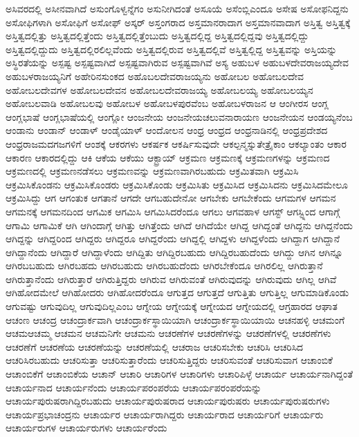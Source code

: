 {ಅಸಿವರದಲ್ಲಿ
ಅಸೀನವಾಗಿದೆ
ಅಸುಂಗೊಳ್ವನ್ನೆಗಂ
ಅಸುನೀಗಿದಂತೆ
ಅಸೂಯೆ
ಅಸೆಂಬ್ಲಿಎಂದೂ
ಅಸೇಷ
ಅಸೋಫನಿದ್ದನು
ಅಸೋಫಿಗಳಾಗಿ
ಅಸೋಫಿಗೆ
ಅಸೋಫ್
ಅಸ್ಕರ್
ಅಸ್ತಂಗರಾದ
ಅಸ್ತಮಾನರಾದಾಗ
ಅಸ್ತಮಾನವಾದಾಗ
ಅಸ್ತಿತ್ವ
ಅಸ್ತಿತ್ವಕ್ಕೆ
ಅಸ್ತಿತ್ವದಲ್ಲಿತ್ತು
ಅಸ್ತಿತ್ವದಲ್ಲಿತ್ತೆಂದು
ಅಸ್ತಿತ್ವದಲ್ಲಿತ್ತೆಂಬುದು
ಅಸ್ತಿತ್ವದಲ್ಲಿದ್ದ
ಅಸ್ತಿತ್ವದಲ್ಲಿದ್ದವು
ಅಸ್ತಿತ್ವದಲ್ಲಿದ್ದು
ಅಸ್ತಿತ್ವದಲ್ಲಿದ್ದುದು
ಅಸ್ತಿತ್ವದಲ್ಲಿರಲಿಲ್ಲವೆಂದು
ಅಸ್ತಿತ್ವದಲ್ಲಿರುವ
ಅಸ್ತಿತ್ವದಲ್ಲಿವೆ
ಅಸ್ತಿತ್ವಲ್ಲಿದ್ದ
ಅಸ್ತಿತ್ವವನ್ನು
ಅಸ್ತಿಯನ್ನು
ಅಸ್ಥಿರತೆಯನ್ನು
ಅಸ್ಪಷ್ಟ
ಅಸ್ಪಷ್ಟವಾಗಿದೆ
ಅಸ್ಪಷ್ಟವಾಗಿರುವ
ಅಸ್ಪಷ್ಟವಾಗಿವೆ
ಅಸ್ಯ
ಅಹುಬಳ
ಅಹುಬಳದೇವರಾಜಯ್ಯದೇವ
ಅಹುಬಳರಾಜಯ್ಯನಿಗೆ
ಅಹೇರಿನಸುಂಕದ
ಅಹೊಬಲದೇವರಾಜಯ್ಯನು
ಅಹೋಬಲ
ಅಹೋಬಲದೇವ
ಅಹೋಬಲದೇವಗಳ
ಅಹೋಬಲದೇವನ
ಅಹೋಬಲದೇವರಾಜಯ್ಯ
ಅಹೋಬಲಯ್ಯ
ಅಹೋಬಲಯ್ಯನ
ಅಹೋಬಲವಾಡಿ
ಅಹೋಬಲವು
ಅಹೋಬಳ
ಅಹೋಬಳಪುರವೆಂಬ
ಅಹೋಬಳರಾಜನ
ಆ
ಆಂಗೀರಸ
ಆಂಗ್ಲ
ಆಂಗ್ಲಭಾಷೆ
ಆಂಗ್ಲಭಾಷೆಯಲ್ಲಿ
ಆಂಗ್ಲೋ
ಆಂಜನೇಯ
ಆಂಜನೇಯಚಲುವನಾರಾಯಣ
ಆಂಜನೇಯನ
ಆಂಡಯ್ಯನೆಂಬ
ಆಂಡಾನು
ಆಂಡಾನ್
ಆಂಡಾಳ್
ಆಂಡೈಯಾಳ್
ಆಂದೋಲನ
ಆಂಧ್ರ
ಆಂಧ್ರದ
ಆಂಧ್ರನಾಡಿನಲ್ಲಿ
ಆಂಧ್ರಪ್ರದೇಶದ
ಆಂಧ್ರರಾಜಮದಗಜಗಳಿಗೆ
ಆಂಶಕ್ಕೆ
ಆಕರಗಳು
ಆಕರ್ಷಕ
ಆಕರ್ಷಿಸುವುದೇ
ಆಕಲ್ಪನ್ಮಸ್ನುತೇತ್ರೈಕಾಂ
ಆಕಲ್ಯಾಂತಂ
ಆಕಾರ
ಆಕಾರಣ
ಆಕಾರದಲ್ಲಿದ್ದು
ಆಕಿ
ಆಕೆಯ
ಆಕೆಯು
ಆಕ್ಟ್ರಾಯ್
ಆಕ್ರಮಣ
ಆಕ್ರಮಣಕ್ಕೆ
ಆಕ್ರಮಣಗಳನ್ನು
ಆಕ್ರಮಣದ
ಆಕ್ರಮಣದಲ್ಲಿ
ಆಕ್ರಮಣನಡೆಸಲು
ಆಕ್ರಮಣವನ್ನು
ಆಕ್ರಮಣವಾಗಿರಬಹುದು
ಆಕ್ರಮಿತವಾಗಿ
ಆಕ್ರಮಿಸಿ
ಆಕ್ರಮಿಸಿಕೊಂಡನು
ಆಕ್ರಮಿಸಿಕೊಂಡರು
ಆಕ್ರಮಿಸಿಕೊಂಡು
ಆಕ್ರಮಿಸಿತು
ಆಕ್ರಮಿಸಿದ
ಆಕ್ರಮಿಸಿದನು
ಆಕ್ರಮಿಸಿದಮೇಲೂ
ಆಕ್ರಮಿಸಿದ್ದು
ಆಗ
ಆಗಂತುಕ
ಆಗತಾನೆ
ಆಗದೇ
ಆಗಬಹುದೇನೋ
ಆಗಬೇಕು
ಆಗಬೇಕೆಂದು
ಆಗಮಗಳ
ಆಗಮನ
ಆಗಮನಕ್ಕೆ
ಆಗಮನದಿಂದ
ಆಗಮಿಕ
ಆಗಮಿಸಿ
ಆಗಮಿಸಿದರೆಂದೂ
ಆಗಲು
ಆಗವಹಾಳ
ಆಗಸ್ಟ್
ಆಗಸ್ಟ್ನಿಂದ
ಆಗಾಗ್ಗೆ
ಆಗಾಮಿ
ಆಗಾಮಿಕೆ
ಆಗಿ
ಆಗಿಂದಾಗ್ಗೆ
ಆಗಿತ್ತು
ಆಗಿತ್ತೆಂದು
ಆಗಿದೆ
ಆಗಿದೆಯೇ
ಆಗಿದ್ದ
ಆಗಿದ್ದಂತೆ
ಆಗಿದ್ದನು
ಆಗಿದ್ದನೆಂದು
ಆಗಿದ್ದನ್ನು
ಆಗಿದ್ದರಿಂದ
ಆಗಿದ್ದರು
ಆಗಿದ್ದರೂ
ಆಗಿದ್ದರೆಂದು
ಆಗಿದ್ದಲ್ಲಿ
ಆಗಿದ್ದಳು
ಆಗಿದ್ದಳೆಂದು
ಆಗಿದ್ದಾಗ
ಆಗಿದ್ದಾನೆ
ಆಗಿದ್ದಾನೆಂದು
ಆಗಿದ್ದಾರೆ
ಆಗಿದ್ದಾಳೆಂದು
ಆಗಿದ್ದಿತು
ಆಗಿದ್ದಿರಬಹುದು
ಆಗಿದ್ದಿರಬಹುದೆಂದು
ಆಗಿದ್ದು
ಆಗಿನ
ಆಗಿನ್ನೂ
ಆಗಿರಬಬಹುದು
ಆಗಿರಬಹದು
ಆಗಿರಬಹುದು
ಆಗಿರಬಹುದೆಂದು
ಆಗಿರಬೇಕೆಂದೂ
ಆಗಿರಲಿಲ್ಲ
ಆಗಿರುತ್ತಾನೆ
ಆಗಿರುತ್ತಾನೆಂದು
ಆಗಿರುತ್ತಾರೆ
ಆಗಿರುತ್ತಿದ್ದರು
ಆಗಿರುವ
ಆಗಿರುವಂತೆ
ಆಗಿರುವುದನ್ನು
ಆಗಿರುವುದು
ಆಗಿಲ್ಲ
ಆಗಿವೆ
ಆಗಿಹೋದಮೇಲೆ
ಆಗಿಹೋದರು
ಆಗಿಹೋದರೆಂದೂ
ಆಗುತ್ತದ
ಆಗುತ್ತದೆ
ಆಗುತ್ತಿತು
ಆಗುತ್ತಿಲ್ಲ
ಆಗುಮಾಡಿಕೊಂಡು
ಆಗುವಷ್ಟು
ಆಗುವುದಿಲ್ಲ
ಆಗುವುದಿಲ್ಲಎಂಬ
ಆಗ್ನೇಯ
ಆಗ್ನೇಯಕ್ಕೆ
ಆಗ್ನೇಯದ
ಆಗ್ನೇಯದಲ್ಲಿ
ಆಗ್ರಹಾರದ
ಆಘಾತ
ಆಚಂಣ
ಆಚಂದ್ರ
ಆಚಂದ್ರಾರ್ಕವಾಗಿ
ಆಚಂದ್ರಾರ್ಕಸ್ಥಾಯಿಯಾಗಿ
ಆಚಂದ್ರಾರ್ಕಸ್ಥಾಯಿಯಾಯಿ
ಆಚನಹಳ್ಳಿ
ಆಚಮಂಗೆ
ಆಚಮಆಚಮ್ಮ
ಆಚಮನ
ಆಚಮನಿಗೇ
ಆಚಮನು
ಆಚರಣೆಗಳ
ಆಚರಣೆಗಳನ್ನು
ಆಚರಣೆಗಳಲ್ಲಿ
ಆಚರಣೆಗಳು
ಆಚರಣೆಗೆ
ಆಚರಣೆಯ
ಆಚರಣೆಯನ್ನು
ಆಚರಣೆಯಲ್ಲಿ
ಆಚರಾಜ
ಆಚರಿಸಬೇಕು
ಆಚರಿಸಿ
ಆಚರಿಸಿದ
ಆಚರಿಸಿರಬಹುದು
ಆಚರಿಸುತ್ತಾ
ಆಚರಿಸುತ್ತಾರೆಂದು
ಆಚರಿಸುತ್ತಿದ್ದರು
ಆಚರಿಸುವಂತೆ
ಆಚರಿಸುವಾಗ
ಆಚಾಂಬಿಕೆ
ಆಚಾಂಬಿಕೆಗೆ
ಆಚಾಂಬಿಕೆಯ
ಆಚಾನ್
ಆಚಾರಿ
ಆಚಾರಿಗಳ
ಆಚಾರಿಗಳು
ಆಚಾರಿಪಿಳ್ಳೆ
ಆಚಾರ್ಯ
ಆಚಾರ್ಯನಾಗಿದ್ದಂತೆ
ಆಚಾರ್ಯನಾದ
ಆಚಾರ್ಯನೆಂದು
ಆಚಾರ್ಯಪರಂಪರೆಯ
ಆಚಾರ್ಯಪರಂಪರೆಯನ್ನು
ಆಚಾರ್ಯಪುರುಷರಾಗಿದ್ದಿರಬಹುದು
ಆಚಾರ್ಯಪುರುಷರಾದ
ಆಚಾರ್ಯಪುರುಷರು
ಆಚಾರ್ಯಪುರುಷರುಗಳು
ಆಚಾರ್ಯಪ್ರಭಾಚಂದ್ರನು
ಆಚಾರ್ಯರ
ಆಚಾರ್ಯರಾಗಿದ್ದರು
ಆಚಾರ್ಯರಾದ
ಆಚಾರ್ಯರಿಗೆ
ಆಚಾರ್ಯರು
ಆಚಾರ್ಯರುಗಳ
ಆಚಾರ್ಯರುಗಳು
ಆಚಾರ್ಯರೆಂದು
}
